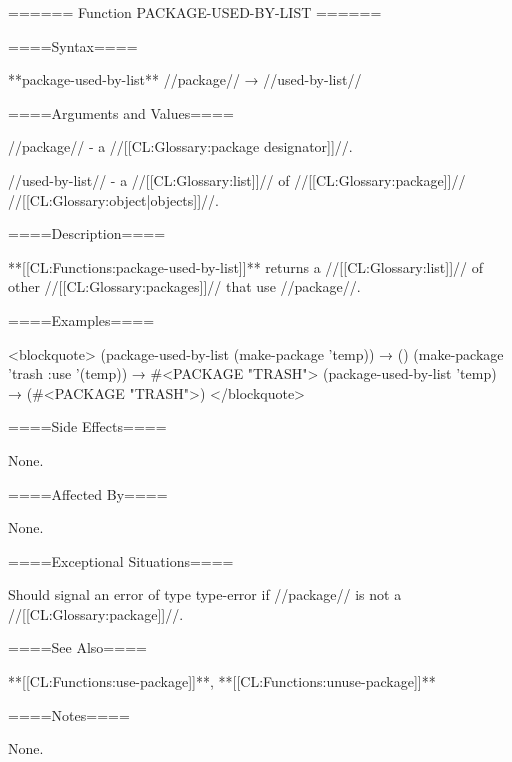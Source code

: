 ====== Function PACKAGE-USED-BY-LIST ======

====Syntax====

**package-used-by-list** //package// → //used-by-list//

====Arguments and Values====

//package// - a //[[CL:Glossary:package designator]]//.

//used-by-list// - a //[[CL:Glossary:list]]// of //[[CL:Glossary:package]]// //[[CL:Glossary:object|objects]]//.

====Description====

**[[CL:Functions:package-used-by-list]]** returns a //[[CL:Glossary:list]]// of other //[[CL:Glossary:packages]]// that use //package//.

====Examples====

<blockquote> (package-used-by-list (make-package 'temp)) → () (make-package 'trash :use '(temp)) → #<PACKAGE "TRASH"> (package-used-by-list 'temp) → (#<PACKAGE "TRASH">) </blockquote>

====Side Effects====

None.

====Affected By====

None.

====Exceptional Situations====

Should signal an error of type type-error if //package// is not a //[[CL:Glossary:package]]//.

====See Also====

**[[CL:Functions:use-package]]**, **[[CL:Functions:unuse-package]]**

====Notes====

None.

